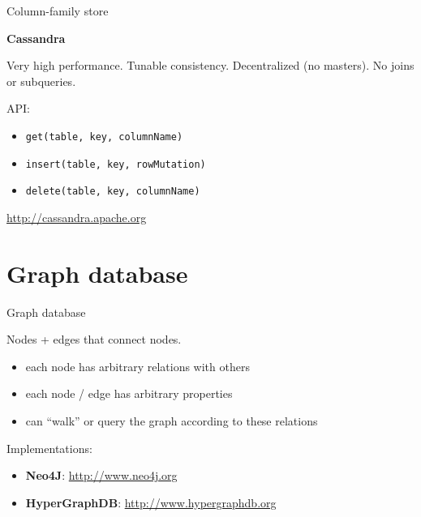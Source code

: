 \documentclass{beamer}
\begin{document}
\begin{frame}{Column-family store}

  \textbf{Cassandra}

  \vskip 0.25in

  Very high performance. Tunable consistency. Decentralized (no
  masters). No joins or subqueries.

  \vskip 0.25in

  API:

  \begin{itemize}
  \item \texttt{get(table, key, columnName)}
  \item \texttt{insert(table, key, rowMutation)}
  \item \texttt{delete(table, key, columnName)}
  \end{itemize}

  \vskip 0.15in

  \url{http://cassandra.apache.org}

\end{frame}

\section{Graph database}

\begin{frame}{Graph database}

  Nodes + edges that connect nodes.

  \begin{itemize}
  \item each node has arbitrary relations with others
  \item each node / edge has arbitrary properties
  \item can ``walk'' or query the graph according to these relations
  \end{itemize}

  Implementations:

  \begin{itemize}
  \item \textbf{Neo4J}: \url{http://www.neo4j.org}
  \item \textbf{HyperGraphDB}: \url{http://www.hypergraphdb.org}
  \end{itemize}

\end{frame}
\end{document}
